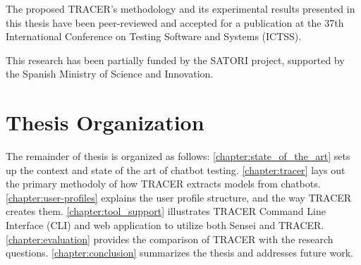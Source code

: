The proposed \ac{TRACER}'s methodology and its experimental results presented in this thesis
have been peer-reviewed and accepted for a publication at the
37th International Conference on Testing Software and Systems (ICTSS).

This research has been partially funded by the SATORI project, supported by the Spanish Ministry of Science and Innovation.

\section{Thesis Organization}

The remainder of thesis is organized as follows:
\autoref{chapter:state_of_the_art} sets up the context and state of the art of chatbot testing.
\autoref{chapter:tracer} lays out the primary methodoly of how \ac{TRACER} extracts models from chatbots.
\autoref{chapter:user-profiles} explains the user profile structure, and the way \ac{TRACER} creates them.
\autoref{chapter:tool_support} illustrates \ac{TRACER} Command Line Interface (CLI) and web application to utilize both Sensei and \ac{TRACER}.
\autoref{chapter:evaluation} provides the comparison of \ac{TRACER} with the research questions.
\autoref{chapter:conclusion} summarizes the thesis and addresses future work.

